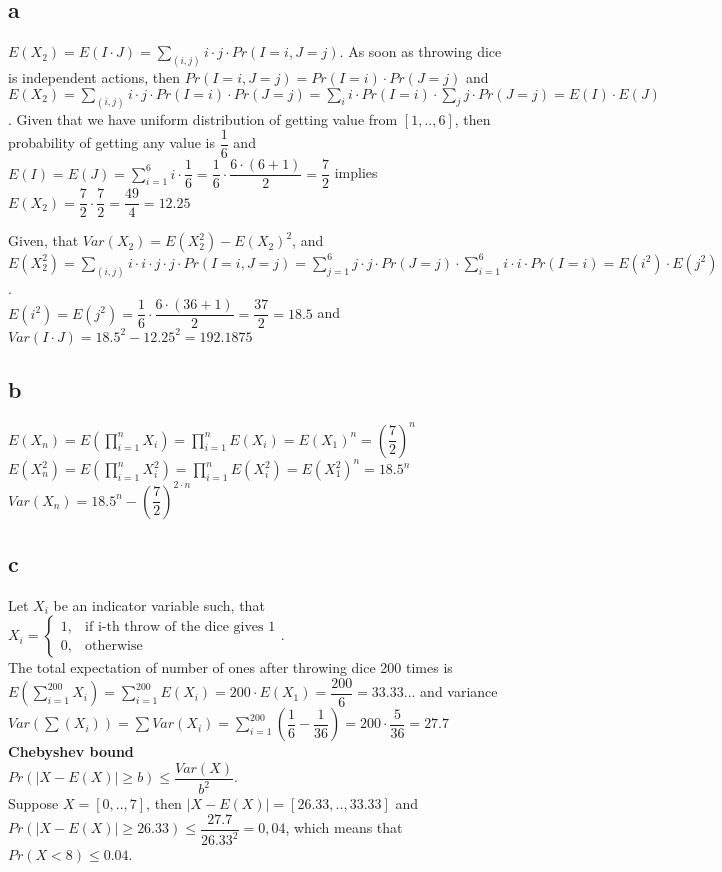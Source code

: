 \subsection*{a}
$E(X_2) = E(I \cdot J) = \sum_{(i,j)}{i \cdot j \cdot Pr(I = i, J = j)}$. As soon as throwing dice is independent actions, then $Pr(I = i, J = j) = Pr(I = i) \cdot Pr(J = j)$ and  
$E(X_2) = \sum_{(i,j)} i\cdot j \cdot Pr(I=i) \cdot Pr(J=j) = \sum_i{i \cdot Pr(I=i) \cdot \sum_j{j \cdot Pr(J=j)}} =
E(I) \cdot E(J)$. Given that we have uniform distribution of getting value from $[1,..,6]$, then probability of getting any value is $\dfrac{1}{6}$ and $E(I) = E(J) = \sum_{i=1}^6{i \cdot \dfrac{1}{6}} = \dfrac{1}{6} \cdot \dfrac {6\cdot (6+1)}{2} = \dfrac{7}{2}$ implies $E(X_2) = \dfrac{7}{2} \cdot \dfrac{7}{2} = \dfrac{49}{4} = 12.25$

Given, that 
$Var(X_2) = E(X_2^2) - E(X_2)^2$, and $E(X_2^2) = 
\sum_{(i,j)}{i\cdot i\cdot j\cdot j\cdot Pr(I = i, J = j)} = 
\sum_{j=1}^6 {j \cdot j \cdot Pr(J=j) \cdot \sum_{i=1}^6 i\cdot i\cdot Pr(I=i)} = 
E(i^2)\cdot E(j^2)$.\\
$E(i^2) = E(j^2) = \dfrac{1}{6} \cdot \dfrac{6\cdot (36+1)}{2} = \dfrac{37}{2} = 18.5$ and $Var(I\cdot J) = 18.5^2 - 12.25^2 = 192.1875$

\subsection*{b}
$E(X_n) = E(\prod_{i=1}^n X_i) = \prod_{i=1}^n E(X_i) = E(X_1)^n = \left(\dfrac{7}{2}\right)^n$\\
$E(X_n^2) = E(\prod_{i=1}^n X_i^2) = \prod_{i=1}^n E( X_i^2) = E(X_1^2)^n = 18.5^n$\\
$Var(X_n) = 18.5^n - \left(\dfrac{7}{2}\right)^{2\cdot n}$\\

\subsection*{c}
Let $X_i$ be an indicator variable such, that 
$X_i=
\begin{cases}
	1, & \text{if i-th throw of the dice gives 1}\\
	0, & \text{otherwise}
\end{cases}$.\\
The total expectation of number of ones after throwing dice 200 times is 
$E(\sum_{i=1}^{200} X_i) = \sum_{i=1}^{200} E(X_i) = 200\cdot E(X_1) = \dfrac{200}{6} = 33.33...$ and variance
$Var(\sum(X_i)) = \sum Var(X_i) = \sum_{i=1}^{200} (\dfrac{1}{6} - \dfrac{1}{36}) = 200 \cdot \dfrac{5}{36} = 27.7$\\
\textbf{Chebyshev bound}\\
$Pr(|X - E(X)| \geq b) \leq \dfrac{Var(X)}{b^2}$.\\
Suppose $X = [0,..,7]$, then $|X - E(X)| = [26.33,..,33.33]$
and  $Pr(|X - E(X)| \geq 26.33) \leq \dfrac{27.7}{26.33^2} = 0,04$, which means that $Pr(X<8) \leq 0.04$.\\

